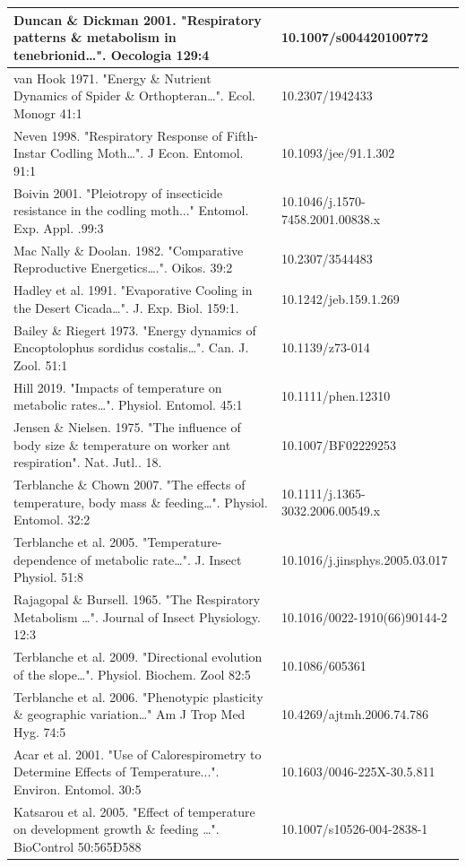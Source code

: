\documentclass{article}
\begin{document}
\begin{table}[h]
\begin{tabular}{|l|l|}
Duncan \& Dickman 2001.  "Respiratory patterns \& metabolism in tenebrionid…". Oecologia 129:4 & 10.1007/s004420100772 \\ \hline
van Hook 1971. "Energy \& Nutrient Dynamics of Spider \& Orthopteran…". Ecol. Monogr 41:1 & 10.2307/1942433 \\ \hline
Neven 1998. "Respiratory Response of   Fifth-Instar Codling Moth…". J Econ. Entomol. 91:1 & 10.1093/jee/91.1.302 \\ \hline
Boivin 2001. "Pleiotropy of   insecticide resistance in the codling moth..." Entomol. Exp. Appl. .99:3 & 10.1046/j.1570-7458.2001.00838.x \\ \hline
Mac Nally \& Doolan. 1982.   "Comparative Reproductive Energetics….".   Oikos. 39:2 & 10.2307/3544483 \\ \hline
Hadley et al. 1991. "Evaporative   Cooling in the Desert Cicada…". J. Exp. Biol. 159:1. & 10.1242/jeb.159.1.269 \\ \hline
Bailey \& Riegert 1973. "Energy   dynamics of Encoptolophus sordidus costalis…". Can. J. Zool. 51:1 & 10.1139/z73-014 \\ \hline
Hill 2019. "Impacts of temperature  on metabolic rates…". Physiol. Entomol.   45:1 & 10.1111/phen.12310 \\ \hline
Jensen \& Nielsen. 1975. "The   influence of body size \& temperature on worker ant respiration".   Nat. Jutl.. 18. & 10.1007/BF02229253 \\ \hline
Terblanche \& Chown 2007. "The   effects of temperature, body mass \& feeding…". Physiol. Entomol.   32:2 & 10.1111/j.1365-3032.2006.00549.x \\ \hline
Terblanche et al. 2005.   "Temperature-dependence of metabolic rate…". J. Insect Physiol. 51:8 & 10.1016/j.jinsphys.2005.03.017 \\ \hline
Rajagopal \& Bursell. 1965. "The   Respiratory Metabolism …". Journal of Insect   Physiology. 12:3 & 10.1016/0022-1910(66)90144-2 \\ \hline
Terblanche et al. 2009. "Directional  evolution of the slope…". Physiol. Biochem. Zool   82:5 & 10.1086/605361 \\ \hline
Terblanche et al. 2006. "Phenotypic   plasticity \& geographic variation…" Am J Trop   Med Hyg. 74:5 & 10.4269/ajtmh.2006.74.786 \\ \hline
Acar et al. 2001. "Use of  Calorespirometry to Determine Effects of Temperature...". Environ. Entomol. 30:5 & 10.1603/0046-225X-30.5.811 \\ \hline
Katsarou et al. 2005. "Effect of  temperature on development growth \& feeding …". BioControl   50:565Ð588 & 10.1007/s10526-004-2838-1 \\ \hline

\end{tabular}
\end{table}
\end{document}
